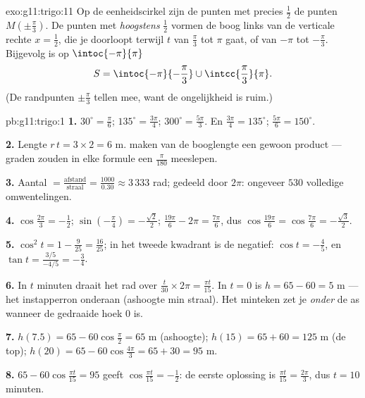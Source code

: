 \begin{solution}{exo:g11:trigo:11}
Op de eenheidscirkel zijn de punten met  precies $\frac12$ de punten
$M\!\left(\pm\frac\pi3\right)$. De punten met  \emph{hoogstens}
$\frac12$ vormen de boog links van de verticale rechte $x = \frac12$, die je
doorloopt terwijl $t$ van $\frac\pi3$ tot $\pi$ gaat, of van $-\pi$ tot
$-\frac\pi3$. Bijgevolg is op $\intoc{-\pi}{\pi}$
\[
S = \intoc{-\pi}{-\frac{\pi}{3}} \cup \intcc{\frac{\pi}{3}}{\pi}.
\]
(De randpunten $\pm\frac\pi3$ tellen mee, want de ongelijkheid is ruim.)
\end{solution}

\begin{solution}{pb:g11:trigo:1}
\textbf{1.} $30^\circ = \frac{\pi}{6}$; $135^\circ = \frac{3\pi}{4}$;
$300^\circ = \frac{5\pi}{3}$. En $\frac{3\pi}{4} = 135^\circ$;
$\frac{5\pi}{6} = 150^\circ$.

\textbf{2.} Lengte $r\,t = 3 \times 2 = 6$ m.  maken van de
booglengte een gewoon product --- graden zouden in elke formule een
$\frac{\pi}{180}$ meeslepen.

\textbf{3.} Aantal  $= \frac{\text{afstand}}{\text{straal}} =
\frac{1000}{0.30} \approx 3\,333$ rad; gedeeld door $2\pi$: ongeveer $530$
volledige omwentelingen.

\textbf{4.} $\cos\frac{2\pi}{3} = -\frac12$;
$\sin\left(-\frac\pi4\right) = -\frac{\sqrt2}{2}$;
$\frac{19\pi}{6} - 2\pi = \frac{7\pi}{6}$, dus
$\cos\frac{19\pi}{6} = \cos\frac{7\pi}{6} = -\frac{\sqrt3}{2}$.

\textbf{5.} $\cos^2 t = 1 - \frac{9}{25} = \frac{16}{25}$; in het tweede
kwadrant is de  negatief: $\cos t = -\frac45$, en
$\tan t = \frac{3/5}{-4/5} = -\frac34$.

\textbf{6.} In $t$ minuten draait het rad over
$\frac{t}{30} \times 2\pi = \frac{\pi t}{15}$. In $t = 0$ is
$h = 65 - 60 = 5$ m --- het instapperron onderaan (ashoogte min straal). Het
minteken zet je \emph{onder} de as wanneer de gedraaide hoek $0$ is.

\textbf{7.} $h(7.5) = 65 - 60\cos\frac{\pi}{2} = 65$ m (ashoogte);
$h(15) = 65 + 60 = 125$ m (de top);
$h(20) = 65 - 60\cos\frac{4\pi}{3} = 65 + 30 = 95$ m.

\textbf{8.} $65 - 60\cos\frac{\pi t}{15} = 95$ geeft
$\cos\frac{\pi t}{15} = -\frac12$: de eerste oplossing is
$\frac{\pi t}{15} = \frac{2\pi}{3}$, dus $t = 10$ minuten.


\end{solution}
